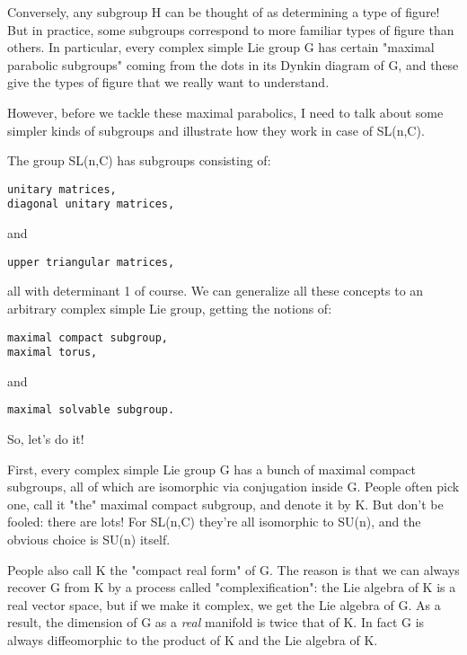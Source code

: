 Conversely, any subgroup H can be thought of as determining a type of
figure!  But in practice, some subgroups correspond to more familiar
types of figure than others.  In particular, every complex simple Lie
group G has certain "maximal parabolic subgroups" coming from the dots 
in its Dynkin diagram of G, and these give the types of figure that we
really want to understand.

However, before we tackle these maximal parabolics, I need to talk 
about some simpler kinds of subgroups and illustrate how they work 
in case of SL(n,C).

The group SL(n,C) has subgroups consisting of:

\begin{verbatim}
unitary matrices, 
diagonal unitary matrices,
\end{verbatim}
    
and

\begin{verbatim}
upper triangular matrices,
\end{verbatim}
    
all with determinant 1 of course.  We can generalize all these concepts
to an arbitrary complex simple Lie group, getting the notions of:

\begin{verbatim}
maximal compact subgroup,
maximal torus, 
\end{verbatim}
    
and

\begin{verbatim}
maximal solvable subgroup.
\end{verbatim}
    
So, let's do it!

First, every complex simple Lie group G has a bunch of maximal compact
subgroups, all of which are isomorphic via conjugation inside G.  People
often pick one, call it "the" maximal compact subgroup, and
denote it by K.  But don't be fooled: there are lots!  For SL(n,C)
they're all isomorphic to SU(n), and the obvious choice is SU(n) itself.

People also call K the "compact real form" of G.  The reason
is that we can always recover G from K by a process called
"complexification": the Lie algebra of K is a real vector
space, but if we make it complex, we get the Lie algebra of G.  As a
result, the dimension of G as a \emph{real} manifold is twice that of K.  
In fact G is always diffeomorphic to the product of K and the Lie algebra
of K.

